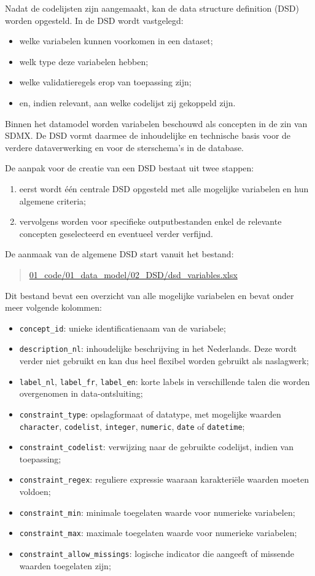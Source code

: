 \documentclass{VSAnote}
\begin{document}
Nadat de codelijsten zijn aangemaakt, kan de data structure definition (DSD) worden opgesteld. In de DSD wordt vastgelegd:
\begin{itemize}[nosep]
\item welke variabelen kunnen voorkomen in een dataset;
\item welk type deze variabelen hebben;
\item welke validatieregels erop van toepassing zijn;
\item en, indien relevant, aan welke codelijst zij gekoppeld zijn.
\end{itemize}

Binnen het datamodel worden variabelen beschouwd als concepten in de zin van SDMX. De DSD vormt daarmee de inhoudelijke en technische basis voor de verdere dataverwerking en voor de sterschema's in de database.

De aanpak voor de creatie van een DSD bestaat uit twee stappen:
\begin{enumerate}
\item eerst wordt één centrale DSD opgesteld met alle mogelijke variabelen en hun algemene criteria;
\item vervolgens worden voor specifieke outputbestanden enkel de relevante concepten geselecteerd en eventueel verder verfijnd.
\end{enumerate}

De aanmaak van de algemene DSD start vanuit het bestand:
\begin{quote}
\url{01_code/01_data_model/02_DSD/dsd_variables.xlsx}
\end{quote}

Dit bestand bevat een overzicht van alle mogelijke variabelen en bevat onder meer volgende kolommen:
\begin{itemize}[nosep]
\item \verb+concept_id+: unieke identificatienaam van de variabele;
\item \verb+description_nl+: inhoudelijke beschrijving in het Nederlands. Deze wordt verder niet gebruikt en kan dus heel flexibel worden gebruikt als naslagwerk;
\item \verb+label_nl+, \verb+label_fr+, \verb+label_en+: korte labels in verschillende talen die worden overgenomen in data-ontsluiting;
\item \verb+constraint_type+: opslagformaat of datatype, met mogelijke waarden \texttt{character}, \texttt{codelist}, \texttt{integer}, \texttt{numeric}, \texttt{date} of \texttt{datetime};
\item \verb+constraint_codelist+: verwijzing naar de gebruikte codelijst, indien van toepassing;
\item \verb+constraint_regex+: reguliere expressie waaraan karakteriële waarden moeten voldoen;
\item \verb+constraint_min+: minimale toegelaten waarde voor numerieke variabelen;
\item \verb+constraint_max+: maximale toegelaten waarde voor numerieke variabelen;
\item \verb+constraint_allow_missings+: logische indicator die aangeeft of missende waarden toegelaten zijn;
\end{itemize}
\end{document}
